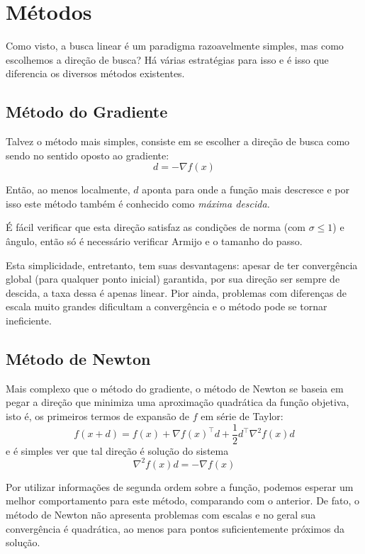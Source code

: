 \documentclass[a4paper,11pt]{article}
\begin{document}
    \section*{Métodos}
        Como visto, a busca linear é um paradigma razoavelmente simples, mas como escolhemos a direção de busca? Há várias estratégias para isso e é
        isso que diferencia os diversos métodos existentes.

        \subsection*{Método do Gradiente}
            Talvez o método mais simples, consiste em se escolher a direção de busca como sendo no sentido oposto ao gradiente:
                $$ d = -\nabla f(x) $$

            Então, ao menos localmente, $d$ aponta para onde a função mais descresce e por isso este método também é conhecido como \emph{máxima descida.}

            É fácil verificar que esta direção satisfaz as condições de norma (com $\sigma \leq 1$) e ângulo, então só é necessário verificar Armijo e o tamanho do passo.

            Esta simplicidade, entretanto, tem suas desvantagens: apesar de ter convergência global (para qualquer ponto inicial) garantida,
            por sua direção ser sempre de descida, a taxa dessa é apenas linear. Pior ainda, problemas com diferenças de escala muito grandes dificultam a convergência
            e o método pode se tornar ineficiente.

        \subsection*{Método de Newton}
            Mais complexo que o método do gradiente, o método de Newton se baseia em pegar a direção que minimiza uma aproximação quadrática da função objetiva,
            isto é, os primeiros termos de expansão de $f$ em série de Taylor:
                $$ f(x + d) = f(x) + \nabla f(x)^\top d + \frac{1}{2}d^\top\nabla^2f(x)d $$
            e é simples ver que tal direção é solução do sistema
                $$ \nabla^2 f(x)d = -\nabla f(x)$$

            Por utilizar informações de segunda ordem sobre a função, podemos esperar um melhor comportamento para este método, comparando com o anterior.
            De fato, o método de Newton não apresenta problemas com escalas e no geral sua convergência é quadrática, ao menos para pontos suficientemente
            próximos da solução.
\end{document}
